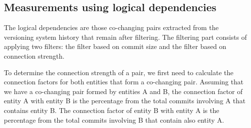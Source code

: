 \documentclass[12pt]{mitthesis}
\begin{document}
\begin{table}[H]
\renewcommand{\arraystretch}{1}
\captionsetup{font=scriptsize}
\caption{Found systems and versions of the systems in GitHub. }
\label{tab:gitfoundsystems}
\centering
{}
\end{table}



\subsection{Measurements using logical dependencies}
\label{sec:current_measurements}

The logical dependencies are those co-changing pairs extracted from the versioning system history that remain after filtering. The filtering part consists of applying two filters: the filter based on commit size and the filter based on connection strength. 

To determine the connection strength of a pair, we first need to calculate the connection factors for both entities that form a co-changing pair.
Assuming that we have a co-changing pair formed by entities A and B, the connection factor of entity A with entity B is the percentage from the total commits involving A that contains entity B. The connection factor of entity B with entity A is the percentage from the total commits involving B that contain also entity A.
\end{document}

